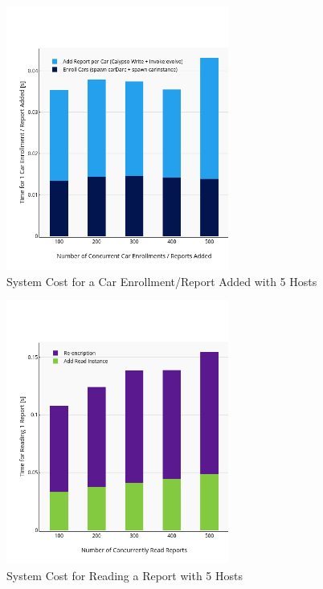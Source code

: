 \begin{figure}[H]
    \centering
    \includegraphics[width=0.65\textwidth, heigth=0.65\textwidth]{Sim/System-Cost-Txns-Enroll.png}
    \vspace{-18pt}
    \caption{System Cost for a Car Enrollment/Report Added with 5 Hosts}
    \label{System Cost Txns Enroll}
\end{figure}
\begin{figure}[H]
    \centering
    \includegraphics[width=0.65\textwidth, heigth=0.65\textwidth]{Sim/System-Cost-Txns-Read.png}
    \vspace{-18pt}
    \caption{System Cost for Reading a Report with 5 Hosts}
    \label{System Cost Txns Read}
\end{figure}



